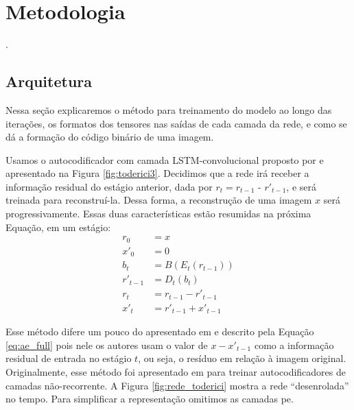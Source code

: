 \chapter{Metodologia}


.  

\section{Arquitetura}

Nessa seção explicaremos o método para treinamento do modelo ao longo das iterações, os formatos dos tensores nas saídas de cada camada da rede, e como se dá a formação do código binário de uma imagem.   

Usamos o autocodificador com camada LSTM-convolucional proposto por \cite{FullResolution2017Toderici} e apresentado na Figura \ref{fig:toderici3}. 
Decidimos que a rede irá receber a informação residual do estágio anterior, dada por $ r_t = r_{t-1}$ - $r'_{t-1}$, e será treinada para reconstruí-la. Dessa forma, a reconstrução de uma imagem $x$ será progressivamente. Essas duas características estão resumidas na próxima Equação, em um estágio:
\begin{equation}
\label{eq:model_1it}
\begin{aligned}
r_{0} &=x\\
x'_0  &=0 \\
b_{t} &= B(E_{t}(r_{t-1})) \\
r'_{t-1} &= D_{t}(b_{t}) \\
r_{t} &= r_{t-1}- r'_{t-1} \\
x'_t &= r'_{t-1} + x'_{t-1}  
\end{aligned}
\end{equation}

Esse método difere um pouco do apresentado em \cite{FullResolution2017Toderici} e descrito pela Equação \ref{eq:ae_full}  pois nele os autores usam o valor de $x-x'_{t-1}$ como a informação residual de entrada no estágio $t$, ou seja, o resíduo em relação à imagem original.
Originalmente, esse método foi apresentado em \cite{Variable2016Toderici} para treinar autocodificadores de camadas não-recorrente. 
A Figura \ref{fig:rede_toderici} mostra a rede ``desenrolada'' no tempo. Para simplificar a representação omitimos as camadas \acrshort{pe}. 

